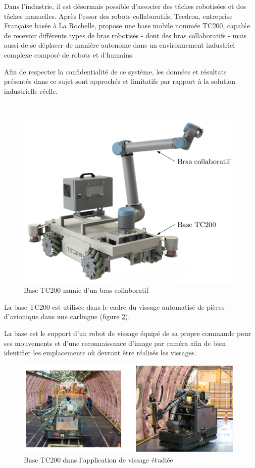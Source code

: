 


Dans l'industrie, il est désormais possible d'associer des tâches robotisées et des tâches manuelles. Après l'essor des robots collaboratifs, Tecdron, entreprise Française basée à La Rochelle, propose une base mobile nommée
TC200, capable de recevoir différents types de bras robotisés - dont des bras collaboratifs - mais aussi de se déplacer de manière autonome dans un environnement industriel complexe composé de robots et d'humains.

Afin de respecter la confidentialité de ce système, les données et résultats présentés dans ce sujet sont approchés et limitatifs par rapport à la solution industrielle réelle.

~\

\begin{figure}
	\vspace{-0.8cm}
\begin{center}
 \includegraphics[width=0.6\linewidth]{img/fig01.png}
  \caption{Base TC200 munie d'un bras collaboratif}
\label{fig01}
 \end{center}
\end{figure}

La base TC200 est utilisée dans le cadre du vissage automatisé de pièces d'avionique dans une carlingue (figure \ref{fig02}).

La base est le support d'un robot de vissage équipé de sa propre commande pour ses mouvements et d'une reconnaissance d'image par caméra afin de bien identifier les emplacements où devront être réalisés les vissages.

\begin{figure}[!ht]
\begin{center}
 \includegraphics[width=0.8\linewidth]{img/fig02.png}
  \caption{Base TC200 dans l'application de vissage étudiée}
\label{fig02}
 \end{center}
\end{figure}

